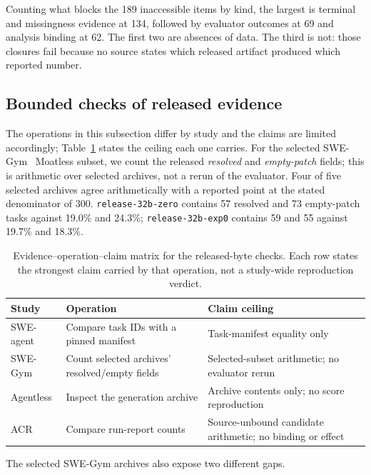 Counting what blocks the 189 inaccessible items by kind, the largest is terminal and
missingness evidence at 134, followed by evaluator outcomes at 69 and analysis binding at
62. The first two are absences of data. The third is not: those closures fail because no
source states which released artifact produced which reported number.

\subsection{Bounded checks of released evidence}
\label{sec:results:recompute}

The operations in this subsection differ by study and the claims are limited accordingly;
Table~\ref{tab:evidence-operation-claim} states the ceiling each one carries. For
the selected SWE-Gym~\cite{TrainingSoftwareEngineering2024} Moatless subset, we count the
released \emph{resolved} and \emph{empty-patch} fields; this is arithmetic over selected
archives, not a rerun of the evaluator. Four of five selected archives agree arithmetically
with a reported point at the stated denominator of 300. \texttt{release-32b-zero} contains 57
resolved and 73 empty-patch tasks against 19.0\% and 24.3\%;
\texttt{release-32b-exp0} contains 59 and 55 against 19.7\% and 18.3\%.

\begin{table}[t]
\caption{Evidence--operation--claim matrix for the released-byte checks. Each row states the
strongest claim carried by that operation, not a study-wide reproduction verdict.}
\label{tab:evidence-operation-claim}
\small
\begin{tabular}{p{}p{}p{}}
\toprule
Study & Operation & Claim ceiling \\
\midrule
SWE-agent & Compare task IDs with a pinned manifest & Task-manifest equality only \\
SWE-Gym & Count selected archives' resolved/empty fields & Selected-subset arithmetic; no evaluator rerun \\
Agentless & Inspect the generation archive & Archive contents only; no score reproduction \\
ACR & Compare run-report counts & Source-unbound candidate arithmetic; no binding or effect \\
\bottomrule
\end{tabular}
\end{table}

The selected SWE-Gym archives also expose two different gaps.

